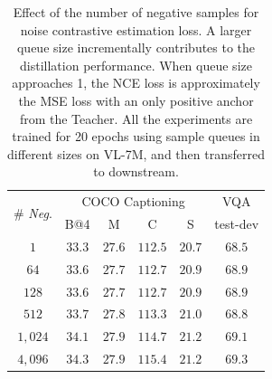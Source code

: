 \begin{table}[t!]
    \centering
    \setlength{\tabcolsep}{7pt} %
    \renewcommand{\arraystretch}{1.2} %
    \caption[Effect of the number of negative samples for noise contrastive estimation loss.]{ Effect of the number of negative samples for noise contrastive estimation loss. A larger queue size incrementally contributes to the distillation performance. When queue size approaches 1, the NCE loss is approximately the MSE loss with an only positive anchor from the Teacher. All the experiments are trained for 20 epochs using sample queues in different sizes on VL-7M, and then transferred to downstream.}    
    { \small
    \begin{tabular}{c|cccc|c}
    \multirow{2}{*}{{\# \textit{Neg}.}} & \multicolumn{4}{c|}{{ COCO Captioning}} & \multicolumn{1}{c}{{ VQA}}  \\ 
    &  {B@4} & {M} & {C} & {S} & {test-dev} \\
    \hline  \rule{0pt}{1.03\normalbaselineskip}
    $1$ & $33.3$  & $27.6$  & $112.5$ & $20.7$ &  $68.5$ \\
    $64$ & \cellcolor{gray!5}$33.6$  & $27.7$  & \cellcolor{gray!5}$112.7$ & $20.9$ &  \cellcolor{gray!5}$68.9$ \\
    $128$ & \cellcolor{gray!10}$33.6$  & $27.7$  & \cellcolor{gray!10}$112.7$ & $20.9$ &  \cellcolor{gray!5}$68.9$ \\
    $512$ & \cellcolor{gray!15}$33.7$  & $27.8$  & \cellcolor{gray!15}$113.3$ & $21.0$ &  \cellcolor{gray!5}$68.8$ \\
    $1,024$ & \cellcolor{gray!20}$34.1$  & $27.9$  & \cellcolor{gray!20}$114.7$ & $21.2$ &  \cellcolor{gray!15}$69.1$ \\
    $4,096$ & \cellcolor{gray!25}$34.3$  & $27.9$  & \cellcolor{gray!25}$115.4$ & $21.2$ & \cellcolor{gray!20}$69.3$  \\
    \end{tabular}
    }
    \label{tab:neg}
\end{table}



